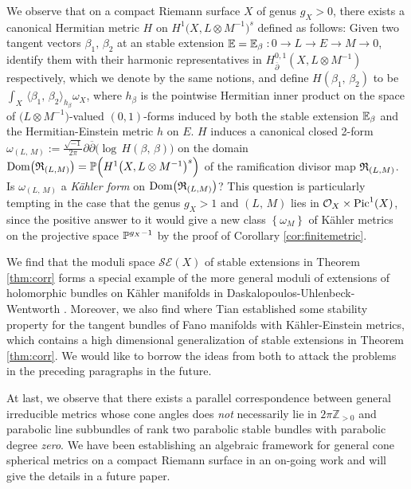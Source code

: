 \documentclass[12pt]{article}
\begin{document}
We observe that on a compact Riemann surface $X$ of genus $g_X>0$, there exists  a canonical Hermitian metric $H$  on  $H^{1}\big(X, L \otimes M^{-1}\big)^{s}$ defined as follows: Given two tangent vectors $\beta_1,\,\beta_2$ at an stable extension ${\Bbb E}={\Bbb E}_\beta$\,:\,$0\to L\to E\to M\to 0$, identify them with their harmonic representatives in $H^{0,1}_{\bar{\partial}}(X, L \otimes M^{-1})$ respectively, which we denote by the same notions,  and define $H(\beta_1,\,\beta_2)$ to be $\int_X\,\langle \beta_1,\,\beta_2 \rangle_{h_\beta} \omega_X$, where
$h_\beta$ is the pointwise Hermitian inner product on the space of $\big(L\otimes M^{-1}\big)$-valued $(0,1)$-forms induced by both the stable extension ${\Bbb E}_\beta$ and the Hermitian-Einstein metric $h$ on $E$. $H$ induces a canonical closed 2-form
$\omega_{(L,\,M)}:=\frac{\sqrt{-1}}{2\pi}\partial {\overline \partial}\big(\log\, H(\beta,\,\beta)\big)$ on the domain ${\rm Dom}\big({\frak R}_{(L,M)}\big)=\mathbb{P}\Big(H^{1}\big(X, L \otimes M^{-1}\big)^{s}\Big)$ of the ramification divisor map ${\frak R}_{(L,M)}$.
Is $\omega_{(L,\,M)}$ a {\it K\" ahler form} on ${\rm Dom}\big({\frak R}_{(L,M)}\big)$? This question is particularly tempting in the case that the genus $g_X > 1$ and $(L,\,M)$ lies in
${\mathcal O}_X\times {\rm Pic}^1(X)$, since the positive answer to it would give a new class $\left\{\omega_M\right\}$ of K\" ahler metrics on the projective space ${\Bbb P}^{g_X-1}$ by the proof of Corollary \ref{cor:finitemetric}.

We find
 that the moduli space $\mathcal{SE}(X)$ of stable extensions in Theorem \ref{thm:corr} forms a special example of the more general moduli of extensions of holomorphic bundles on K\"ahler manifolds in Daskalopoulos-Uhlenbeck-Wentworth \cite{DUW95}. Moreover, we also find \cite{Tian92} where
Tian established some stability property for the tangent bundles of Fano manifolds with K\"ahler-Einstein metrics, which contains a high dimensional generalization of stable extensions in Theorem \ref{thm:corr}.
We would like to borrow the ideas from both \cite{Tian92, DUW95} to attack the problems in the preceding paragraphs in the future.

At last, we observe that there exists a parallel correspondence between general irreducible metrics whose cone angles does {\it not} necessarily lie in $2\pi{\mathbb Z_{>0}}$ and parabolic line subbundles of rank two parabolic stable bundles with parabolic degree {\it zero}. We have been establishing an algebraic framework for general cone spherical metrics on a compact Riemann surface in an on-going work and will give the details in a future paper.
\end{document}
